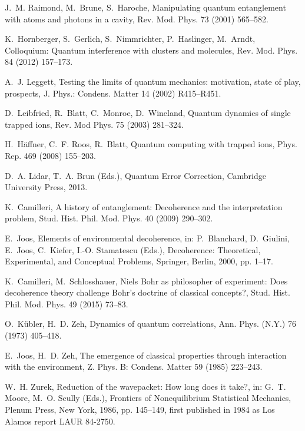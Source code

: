 \documentclass[3p,sort&compress]{elsarticle}
\begin{document}
\begin{thebibliography}{100}
J.~M. Raimond, M.~Brune, S.~Haroche, Manipulating quantum entanglement with
  atoms and photons in a cavity, Rev. Mod. Phys. 73 (2001) 565--582.

K.~Hornberger, S.~Gerlich, S.~Nimmrichter, P.~Haslinger, M.~Arndt, Colloquium:
  Quantum interference with clusters and molecules, Rev. Mod. Phys. 84 (2012)
  157--173.

A.~J. Leggett, Testing the limits of quantum mechanics: motivation, state of
  play, prospects, J. Phys.: Condens. Matter 14 (2002) R415--R451.

D.~Leibfried, R.~Blatt, C.~Monroe, D.~Wineland, Quantum dynamics of single
  trapped ions, Rev. Mod Phys. 75 (2003) 281--324.

H.~H{\"a}ffner, C.~F. Roos, R.~Blatt, Quantum computing with trapped ions,
  Phys. Rep. 469 (2008) 155--203.

D.~A. Lidar, T.~A. Brun (Eds.), Quantum Error Correction, Cambridge University
  Press, 2013.

K.~Camilleri, A history of entanglement: {D}ecoherence and the interpretation
  problem, Stud. Hist. Phil. Mod. Phys. 40 (2009) 290--302.

E.~Joos, Elements of environmental decoherence, in: P.~Blanchard, D.~Giulini,
  E.~Joos, C.~Kiefer, I.-O. Stamatescu (Eds.), Decoherence: Theoretical,
  Experimental, and Conceptual Problems, Springer, Berlin, 2000, pp. 1--17.

K.~Camilleri, M.~Schlosshauer, Niels {B}ohr as philosopher of experiment:
  {D}oes decoherence theory challenge {B}ohr's doctrine of classical concepts?,
  Stud. Hist. Phil. Mod. Phys. 49 (2015) 73--83.

O.~K{\"u}bler, H.~D. Zeh, Dynamics of quantum correlations, Ann. Phys. (N.Y.)
  76 (1973) 405--418.

E.~Joos, H.~D. Zeh, The emergence of classical properties through interaction
  with the environment, Z. Phys. B: Condens. Matter 59 (1985) 223--243.

W.~H. Zurek, Reduction of the wavepacket: {H}ow long does it take?, in: G.~T.
  Moore, M.~O. Scully (Eds.), Frontiers of Nonequilibrium Statistical
  Mechanics, Plenum Press, New York, 1986, pp. 145--149, first published in
  1984 as Los Alamos report LAUR 84-2750.


\end{thebibliography}
\end{document}
